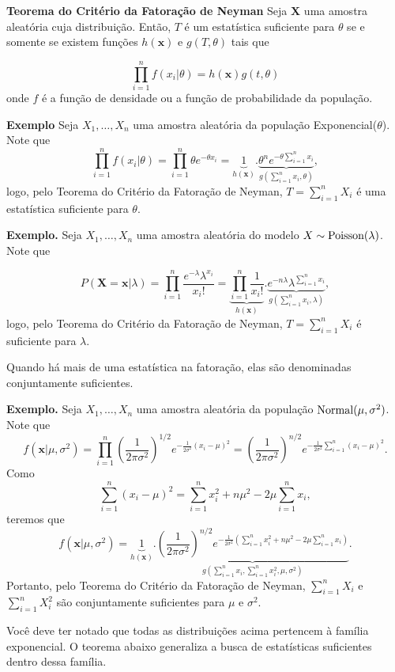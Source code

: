 \documentclass[
  letterpaper,
  DIV=11,
  numbers=noendperiod]{scrartcl}
\begin{document}
\textbf{Teorema do Critério da Fatoração de Neyman} Seja \(\textbf{X}\)
uma amostra aleatória cuja distribuição. Então, \(T\) é um estatística
suficiente para \(\theta\) se e somente se existem funções
\(h(\textbf{x})\) e \(g(T,\theta)\) tais que

\[\prod_{i=1}^nf(x_i|\theta)=h(\textbf{x})g(t,\theta)\] onde \(f\) é a
função de densidade ou a função de probabilidade da população.

\textbf{Exemplo} Seja \(X_1,\ldots,X_n\) uma amostra aleatória da
população Exponencial(\(\theta\)). Note que
\[\prod_{i=1}^n  f(x_i|\theta)=\prod_{i=1}^n \theta e^{-\theta x_i}=\underbrace{1}_{h(\textbf{x})}. \underbrace{\theta^ne^{-\theta\sum_{i=1}^n x_i}}_{g(\sum_{i=1}^n x_i,\theta)},\]
logo, pelo Teorema do Critério da Fatoração de Neyman,
\(T=\sum_{i=1}^{n}X_i\) é uma estatística suficiente para \(\theta\).

\textbf{Exemplo.} Seja \(X_1,\ldots,X_n\) uma amostra aleatória do
modelo \(X\sim\hbox{Poisson}(\lambda)\). Note que

\[P(\textbf{X}=\textbf{x}|\lambda)=\prod_{i=1}^n\frac{e^{-\lambda}\lambda^{x_i}}{x_i!}=\underbrace{\prod_{i=1}^n\frac{1}{x_i!}}_{h(\textbf{x})}.\underbrace{e^{-n\lambda}\lambda^{\sum_{i=1}^n x_i}}_{g(\sum_{i=1}^n x_i,\lambda)},\]
logo, pelo Teorema do Critério da Fatoração de Neyman,
\(T=\sum_{i=1}^n X_i\) é suficiente para \(\lambda\).

Quando há mais de uma estatística na fatoração, elas são denominadas
conjuntamente suficientes.

\textbf{Exemplo.} Seja \(X_1,\ldots,X_n\) uma amostra aleatória da
população \(\hbox{Normal}(\mu,\sigma^2)\). Note que
\[f(\textbf{x}|\mu,\sigma^2)=\prod_{i=1}^n\left(\frac{1}{2\pi\sigma^2}\right)^{1/2} e^{-\frac{1}{2\sigma^2}(x_i-\mu)^2}=\left(\frac{1}{2\pi\sigma^2}\right)^{n/2} e^{-\frac{1}{2\sigma^2}\sum_{i=1}^n(x_i-\mu)^2}.\]
Como
\[\sum_{i=1}^n(x_i-\mu)^2=\sum_{i=1}^n x_i^2 +n\mu^2-2\mu\sum_{i=1}^n x_i,\]
teremos que
\[f(\textbf{x}|\mu,\sigma^2)=\underbrace{1}_{h(\textbf{x})}.\underbrace{\left(\frac{1}{2\pi\sigma^2}\right)^{n/2} e^{-\frac{1}{2\sigma^2}\left(\sum_{i=1}^n x_i^2 +n\mu^2-2\mu\sum_{i=1}^n x_i\right)}}_{g( \sum_{i=1}^n x_{i},\sum_{i=1}^n x_i^2,\mu,\sigma^2)}.\]
Portanto, pelo Teorema do Critério da Fatoração de Neyman,
\(\sum_{i=1}^nX_i\) e \(\sum_{i=1}^n X_i^2\) são conjuntamente
suficientes para \(\mu\) e \(\sigma^2\).

Você deve ter notado que todas as distribuições acima pertencem à
família exponencial. O teorema abaixo generaliza a busca de estatísticas
suficientes dentro dessa família.
\end{document}

